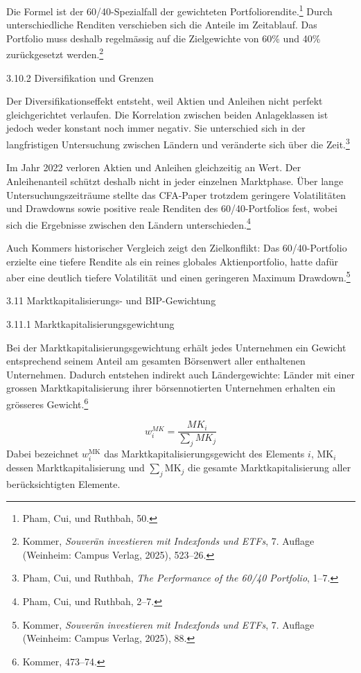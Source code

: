 \documentclass[
  ngerman,
  a4paper,
  DIV=11,
  oneside]{scrreprt}
\begin{document}
Die Formel ist der 60/40-Spezialfall der gewichteten
Portfoliorendite.\footnote{Pham, Cui, und Ruthbah, 50.} Durch
unterschiedliche Renditen verschieben sich die Anteile im Zeitablauf.
Das Portfolio muss deshalb regelmässig auf die Zielgewichte von 60\% und
40\% zurückgesetzt werden.\footnote{Kommer, \emph{Souverän investieren
  mit Indexfonds und ETFs}, 7. Auflage (Weinheim: Campus Verlag, 2025),
  523--26.}

3.10.2 Diversifikation und Grenzen

Der Diversifikationseffekt entsteht, weil Aktien und Anleihen nicht
perfekt gleichgerichtet verlaufen. Die Korrelation zwischen beiden
Anlageklassen ist jedoch weder konstant noch immer negativ. Sie
unterschied sich in der langfristigen Untersuchung zwischen Ländern und
veränderte sich über die Zeit.\footnote{Pham, Cui, und Ruthbah,
  \emph{The {Performance} of the 60/40 {Portfolio}}, 1--7.}

Im Jahr 2022 verloren Aktien und Anleihen gleichzeitig an Wert. Der
Anleihenanteil schützt deshalb nicht in jeder einzelnen Marktphase. Über
lange Untersuchungszeiträume stellte das CFA-Paper trotzdem geringere
Volatilitäten und Drawdowns sowie positive reale Renditen des
60/40-Portfolios fest, wobei sich die Ergebnisse zwischen den Ländern
unterschieden.\footnote{Pham, Cui, und Ruthbah, 2--7.}

Auch Kommers historischer Vergleich zeigt den Zielkonflikt: Das
60/40-Portfolio erzielte eine tiefere Rendite als ein reines globales
Aktienportfolio, hatte dafür aber eine deutlich tiefere Volatilität und
einen geringeren Maximum Drawdown.\footnote{Kommer, \emph{Souverän
  investieren mit Indexfonds und ETFs}, 7. Auflage (Weinheim: Campus
  Verlag, 2025), 88.}

3.11 Marktkapitalisierungs- und BIP-Gewichtung

3.11.1 Marktkapitalisierungsgewichtung

Bei der Marktkapitalisierungsgewichtung erhält jedes Unternehmen ein
Gewicht entsprechend seinem Anteil am gesamten Börsenwert aller
enthaltenen Unternehmen. Dadurch entstehen indirekt auch Ländergewichte:
Länder mit einer grossen Marktkapitalisierung ihrer börsennotierten
Unternehmen erhalten ein grösseres Gewicht.\footnote{Kommer, 473--74.}

\[
w_i^{MK}=\frac{MK_i}{\sum_j MK_j}
\] Dabei bezeichnet \textbf{\(w_i^{\mathrm{MK}}\)} das
Marktkapitalisierungsgewicht des Elements \textbf{\(i\)},
\textbf{\(\mathrm{MK}_i\)} dessen Marktkapitalisierung und
\textbf{\(\sum_j \mathrm{MK}_j\)} die gesamte Marktkapitalisierung aller
berücksichtigten Elemente.
\end{document}
